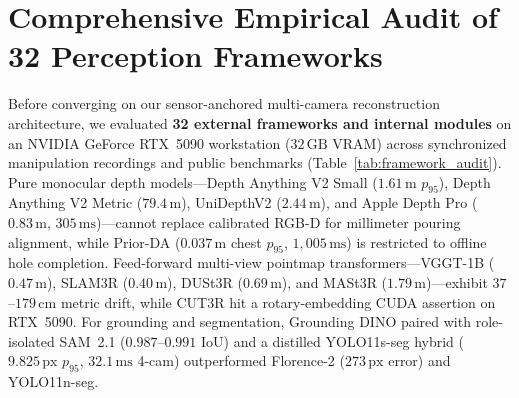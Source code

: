 \documentclass{evidencescene}
\begin{document}
\appendix

\section{Comprehensive Empirical Audit of 32 Perception Frameworks}
\label{app:landscape}

Before converging on our sensor-anchored multi-camera reconstruction architecture, we evaluated \textbf{32 external frameworks and internal modules} on an NVIDIA GeForce RTX~5090 workstation ($32\,\mathrm{GB}$ VRAM) across synchronized manipulation recordings and public benchmarks (Table~\ref{tab:framework_audit}). Pure monocular depth models---Depth Anything V2 Small ($1.61\,\mathrm{m}$ $p_{95}$), Depth Anything V2 Metric ($79.4\,\mathrm{m}$), UniDepthV2 ($2.44\,\mathrm{m}$), and Apple Depth Pro ($0.83\,\mathrm{m}$, $305\,\mathrm{ms}$)---cannot replace calibrated RGB-D for millimeter pouring alignment, while Prior-DA ($0.037\,\mathrm{m}$ chest $p_{95}$, $1{,}005\,\mathrm{ms}$) is restricted to offline hole completion. Feed-forward multi-view pointmap transformers---VGGT-1B ($0.47\,\mathrm{m}$), SLAM3R ($0.40\,\mathrm{m}$), DUSt3R ($0.69\,\mathrm{m}$), and MASt3R ($1.79\,\mathrm{m}$)---exhibit $37$--$179\,\mathrm{cm}$ metric drift, while CUT3R hit a rotary-embedding CUDA assertion on RTX~5090. For grounding and segmentation, Grounding DINO paired with role-isolated SAM~2.1 ($0.987$--$0.991$ IoU) and a distilled YOLO11s-seg hybrid ($9.825\,\mathrm{px}$ $p_{95}$, $32.1\,\mathrm{ms}$ 4-cam) outperformed Florence-2 ($273\,\mathrm{px}$ error) and YOLO11n-seg.
\end{document}
